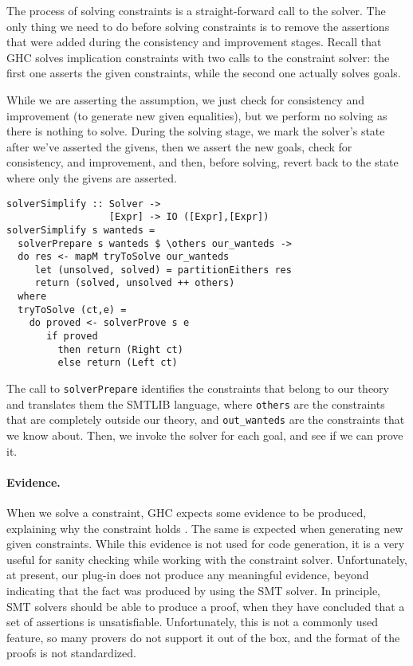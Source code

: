 \documentclass{sigplanconf}
\begin{document}
The process of solving constraints is a straight-forward call to the
solver.  The only thing we need to do before solving constraints is
to remove the assertions that were added during the consistency and
improvement stages.  Recall that GHC solves implication constraints
with two calls to the constraint solver: the first one asserts
the given constraints, while the second one actually solves goals.

While we are asserting the assumption, we just check for consistency
and improvement (to generate new given equalities), but we perform
no solving as there is nothing to solve.  During the solving stage,
we mark the solver's state after we've asserted the givens,
then we assert the new goals, check for consistency, and improvement,
and then, before solving, revert back to the state where only
the givens are asserted.
\begin{Verbatim}
solverSimplify :: Solver ->
                  [Expr] -> IO ([Expr],[Expr])
solverSimplify s wanteds =
  solverPrepare s wanteds $ \others our_wanteds ->
  do res <- mapM tryToSolve our_wanteds
     let (unsolved, solved) = partitionEithers res
     return (solved, unsolved ++ others)
  where
  tryToSolve (ct,e) =
    do proved <- solverProve s e
       if proved
         then return (Right ct)
         else return (Left ct)
\end{Verbatim}
The call to \verb"solverPrepare" identifies the constraints that belong
to our theory and translates them the SMTLIB language, where \Verb"others"
are the constraints that are completely outside our theory, and
\Verb"out_wanteds" are the constraints that we know about. Then,
we invoke the solver for each goal, and see if we can prove it.

\paragraph{Evidence.} When we solve a constraint, GHC expects some
evidence to be produced, explaining why the constraint holds
\cite{fc-evidence}.  The same is expected when generating new given
constraints.  While this evidence is not used for code generation,
it is a very useful for sanity checking while working with the constraint
solver.  Unfortunately, at present, our plug-in does not produce any
meaningful evidence, beyond indicating that the fact was produced
by using the SMT solver. In principle, SMT solvers should be able to
produce a proof, when they have concluded that a set of assertions
is unsatisfiable.  Unfortunately, this is not a commonly used feature,
so many provers do not support it out of the box, and the format of the
proofs is not standardized.
\end{document}
